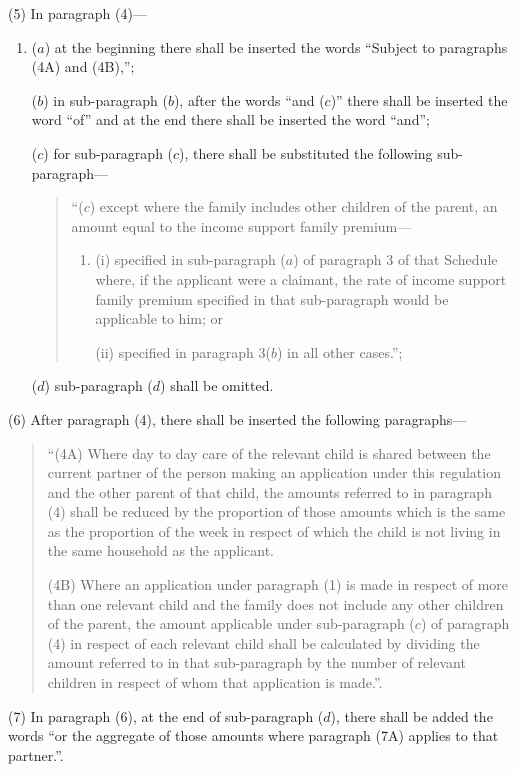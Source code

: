 \documentclass[12pt,a4paper]{article}
\begin{document}
(5) In paragraph (4)—
\begin{enumerate}\item[]
($a$) at the beginning there shall be inserted the words “Subject to paragraphs (4A) and (4B),”;

($b$) in sub-paragraph ($b$), after the words “and ($c$)” there shall be inserted the word “of” and at the end there shall be inserted the word “and”;

($c$) for sub-paragraph ($c$), there shall be substituted the following sub-paragraph—
\begin{quotation}
“($c$) except where the family includes other children of the parent, an amount equal to the income support family premium—
\begin{enumerate}\item[]
(i) specified in sub-paragraph ($a$) of paragraph 3 of that Schedule where, if the applicant were a claimant, the rate of income support family premium specified in that sub-paragraph would be applicable to him; or

(ii) specified in paragraph 3($b$) in all other cases.”;
\end{enumerate}
\end{quotation}

($d$) sub-paragraph ($d$) shall be omitted.
\end{enumerate}

(6) After paragraph (4), there shall be inserted the following paragraphs—
\begin{quotation}
“(4A) Where day to day care of the relevant child is shared between the current partner of the person making an application under this regulation and the other parent of that child, the amounts referred to in paragraph (4) shall be reduced by the proportion of those amounts which is the same as the proportion of the week in respect of which the child is not living in the same household as the applicant.

(4B) Where an application under paragraph (1) is made in respect of more than one relevant child and the family does not include any other children of the parent, the amount applicable under sub-paragraph ($c$) of paragraph (4) in respect of each relevant child shall be calculated by dividing the amount referred to in that sub-paragraph by the number of relevant children in respect of whom that application is made.”.
\end{quotation}

(7) In paragraph (6), at the end of sub-paragraph ($d$), there shall be added the words “or the aggregate of those amounts where paragraph (7A) applies to that partner.”.
\end{document}

